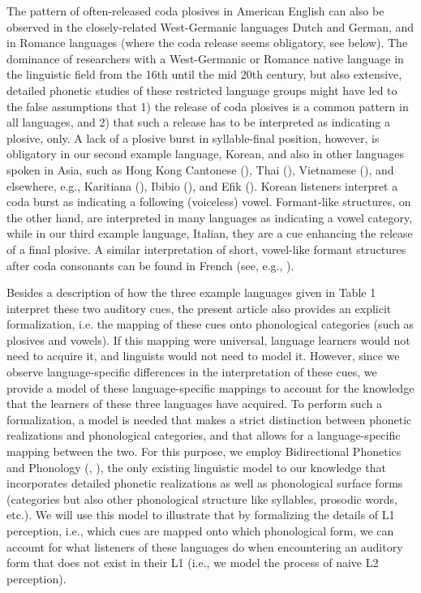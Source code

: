 \documentclass[output=paper,colorlinks,citecolor=brown]{langscibook}
\begin{document}
The pattern of often-released coda plosives in American English can also be observed in the closely-related West-Germanic languages Dutch and German, and in Romance languages (where the coda release seems obligatory, see  below). The dominance of researchers with a West-Germanic or Romance native language in the linguistic field from the 16th until the mid 20th century, but also extensive, detailed phonetic studies of these restricted language groups might have led to the false assumptions that 1) the release of coda plosives is a common pattern in all languages, and 2) that such a release has to be interpreted as indicating a plosive, only. A lack of a plosive burst in syllable-final position, however, is obligatory in our second example language, Korean, and also in other languages spoken in Asia, such as Hong Kong Cantonese (\cite{BauerBenedict1997}), Thai (\cite{AbramsonTinsabadh1999}), Vietnamese (\cite{Kirby2011}), and elsewhere, e.g., Karitiana (\cite{StortoDemolin2002}), Ibibio (\cite{Urua2004}), and Efik (\cite{Cook1969}). Korean listeners interpret a coda burst as indicating a following (voiceless) vowel.
Formant-like structures, on the other hand, are interpreted in many languages as indicating a vowel category, while in our third example language, Italian, they are a cue enhancing the release of a final plosive. A similar interpretation of short, vowel-like formant structures after coda consonants can be found in French (see, e.g., \cite{FlegeHillenbrand1987}). 

\newpage
Besides a description of how the three example languages given in Table 1 interpret these two auditory cues, the present article also provides an explicit formalization, i.e. the mapping of these cues onto phonological categories (such as plosives and vowels). If this mapping were universal, language learners would not need to acquire it, and linguists would not need to model it. However, since we observe language-specific differences in the interpretation of these cues, we provide a model of these language-specific mappings to account for the knowledge that the learners of these three languages have acquired. To perform such a formalization, a model is needed that makes a strict distinction between phonetic realizations and phonological categories, and that allows for a language-specific mapping between the two. For this purpose, we employ Bidirectional Phonetics and Phonology (\cite{Boersma2007}, \citeyear{Boersma2011,BoersmaHamann2009}), the only existing linguistic model to our knowledge that incorporates detailed phonetic realizations as well as phonological surface forms (categories but also other phonological structure like syllables, prosodic words, etc.). We will use this model to illustrate that by formalizing the details of L1 perception, i.e., which cues are mapped onto which phonological form, we can account for what listeners of these languages do when encountering an auditory form that does not exist in their L1 (i.e., we model the process of naive L2 perception).
\end{document}
